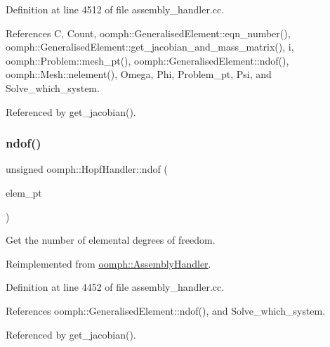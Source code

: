 Definition at line 4512 of file assembly\+\_\+handler.\+cc.



References C, Count, oomph\+::\+Generalised\+Element\+::eqn\+\_\+number(), oomph\+::\+Generalised\+Element\+::get\+\_\+jacobian\+\_\+and\+\_\+mass\+\_\+matrix(), i, oomph\+::\+Problem\+::mesh\+\_\+pt(), oomph\+::\+Generalised\+Element\+::ndof(), oomph\+::\+Mesh\+::nelement(), Omega, Phi, Problem\+\_\+pt, Psi, and Solve\+\_\+which\+\_\+system.



Referenced by get\+\_\+jacobian().

\mbox{\label{classoomph_1_1HopfHandler_a8d1b73ec4e9b8b27252b4bacf2ef7f38}} 
\subsubsection{\texorpdfstring{ndof()}{ndof()}}
{\footnotesize\ttfamily unsigned oomph\+::\+Hopf\+Handler\+::ndof (\begin{DoxyParamCaption}\item[{\hyperlink{classoomph_1_1GeneralisedElement}{Generalised\+Element} $\ast$const \&}]{elem\+\_\+pt }\end{DoxyParamCaption})\hspace{0.3cm}{\ttfamily [virtual]}}



Get the number of elemental degrees of freedom. 



Reimplemented from \hyperlink{classoomph_1_1AssemblyHandler_a09213be8f4aa009e0366460a7ed78e68}{oomph\+::\+Assembly\+Handler}.



Definition at line 4452 of file assembly\+\_\+handler.\+cc.



References oomph\+::\+Generalised\+Element\+::ndof(), and Solve\+\_\+which\+\_\+system.



Referenced by get\+\_\+jacobian().

\mbox{\label{classoomph_1_1HopfHandler_a788a0cf74664712827f46bf26e078994}} 
